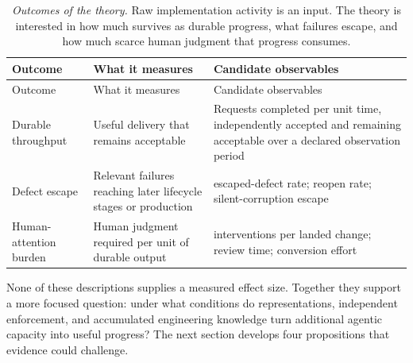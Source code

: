 {\footnotesize
\begin{longtable}[]{@{}
  >{\raggedright\arraybackslash}p{}
  >{\raggedright\arraybackslash}p{}
  >{\raggedright\arraybackslash}p{}@{}}
\caption[The three MAGE outcomes and their observables]{\emph{Outcomes of the theory.} Raw implementation activity is an input. The theory is interested in how much survives as durable progress, what failures escape, and how much scarce human judgment that progress consumes.}\label{mage-outcomes}\tabularnewline
\toprule\noalign{}
\begin{minipage}[b]{\linewidth}\raggedright
Outcome
\end{minipage} & \begin{minipage}[b]{\linewidth}\raggedright
What it measures
\end{minipage} & \begin{minipage}[b]{\linewidth}\raggedright
Candidate observables
\end{minipage} \\
\midrule\noalign{}
\endfirsthead
\toprule\noalign{}
\begin{minipage}[b]{\linewidth}\raggedright
Outcome
\end{minipage} & \begin{minipage}[b]{\linewidth}\raggedright
What it measures
\end{minipage} & \begin{minipage}[b]{\linewidth}\raggedright
Candidate observables
\end{minipage} \\
\midrule\noalign{}
\endhead
\bottomrule\noalign{}
\endlastfoot
Durable throughput & Useful delivery that remains acceptable & Requests completed per unit time, independently accepted and remaining acceptable over a declared observation period \\
Defect escape & Relevant failures reaching later lifecycle stages or production & escaped-defect rate; reopen rate; silent-corruption escape \\
Human-attention burden & Human judgment required per unit of durable output & interventions per landed change; review time; conversion effort \\
\end{longtable}
}


None of these descriptions supplies a measured effect size. Together they support a more focused question: under what conditions do representations, independent enforcement, and accumulated engineering knowledge turn additional agentic capacity into useful progress? The next section develops four propositions that evidence could challenge.
